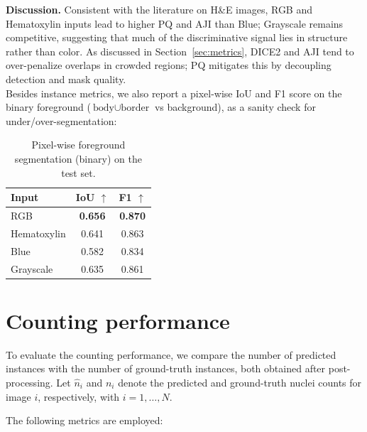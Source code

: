 \documentclass[target=bach,aauheader=,style=]{thud}
\begin{document}
\noindent\textbf{Discussion.} 
Consistent with the literature on H\&E images, RGB and Hematoxylin inputs lead to higher PQ and AJI than Blue; Grayscale remains competitive, suggesting that much of the discriminative signal lies in structure rather than color. 
As discussed in Section~\ref{sec:metrics}, DICE2 and AJI tend to over-penalize overlaps in crowded regions; PQ mitigates this by decoupling detection and mask quality.\\

Besides instance metrics, we also report a pixel-wise IoU and F1 score on the binary foreground ($\text{body}\cup\text{border}$ vs background), as a sanity check for under/over-segmentation:

\begin{table}[ht]
\centering
\caption{Pixel-wise foreground segmentation (binary) on the test set.}
\label{tab:pix-binary}
\small
\begin{tabular}{lcc}
\toprule
\textbf{Input} & \textbf{IoU} $\uparrow$ & \textbf{F1} $\uparrow$ \\
\midrule
RGB         & \textbf{0.656} & \textbf{0.870} \\
Hematoxylin & 0.641 & 0.863 \\
Blue        & 0.582 & 0.834 \\
Grayscale   & 0.635 & 0.861 \\
\bottomrule
\end{tabular}
\end{table}

\section{Counting performance}
To evaluate the counting performance, we compare the number of predicted instances with the number of ground-truth instances, both obtained after post-processing. 
Let $\hat{n}_i$ and $n_i$ denote the predicted and ground-truth nuclei counts for image $i$, respectively, with $i=1,\dots,N$.

The following metrics are employed:
\end{document}
